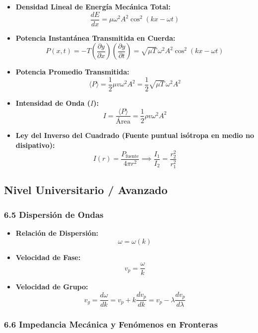 \documentclass[11pt,a4paper]{article}
\begin{document}
\begin{itemize}
  \item \textbf{Densidad Lineal de Energía Mecánica Total:}
  \[
    \frac{dE}{dx} = \mu \omega^2 A^2 \cos^2(kx - \omega t)
  \]
  \item \textbf{Potencia Instantánea Transmitida en Cuerda:}
  \[
    P(x, t) = -T \left( \frac{\partial y}{\partial x} \right) \left( \frac{\partial y}{\partial t} \right) = \sqrt{\mu T} \, \omega^2 A^2 \cos^2(kx - \omega t)
  \]
  \item \textbf{Potencia Promedio Transmitida:}
  \[
    \langle P \rangle = \frac{1}{2} \mu v \omega^2 A^2 = \frac{1}{2} \sqrt{\mu T} \, \omega^2 A^2
  \]
  \item \textbf{Intensidad de Onda ($I$):}
  \[
    I = \frac{\langle P \rangle}{\text{Área}} = \frac{1}{2} \rho v \omega^2 A^2
  \]
  \item \textbf{Ley del Inverso del Cuadrado (Fuente puntual isótropa en medio no disipativo):}
  \[
    I(r) = \frac{P_{\text{fuente}}}{4\pi r^2} \implies \frac{I_1}{I_2} = \frac{r_2^2}{r_1^2}
  \]
\end{itemize}

\subsection*{Nivel Universitario / Avanzado}

\subsubsection*{6.5 Dispersión de Ondas}

\begin{itemize}
  \item \textbf{Relación de Dispersión:}
  \[
    \omega = \omega(k)
  \]
  \item \textbf{Velocidad de Fase:}
  \[
    v_p = \frac{\omega}{k}
  \]
  \item \textbf{Velocidad de Grupo:}
  \[
    v_g = \frac{d\omega}{dk} = v_p + k \frac{dv_p}{dk} = v_p - \lambda \frac{dv_p}{d\lambda}
  \]
\end{itemize}

\subsubsection*{6.6 Impedancia Mecánica y Fenómenos en Fronteras}
\end{document}
